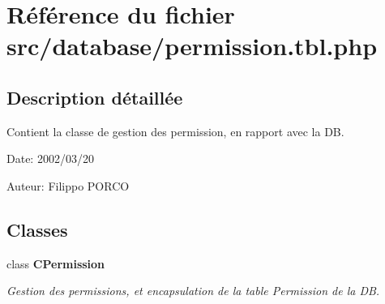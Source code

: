 \section{Référence du fichier src/database/permission.tbl.php}
\label{permission_8tbl_8php}


\subsection{Description détaillée}
Contient la classe de gestion des permission, en rapport avec la DB. 

\begin{Desc}
\item[Date:]2002/03/20\end{Desc}
\begin{Desc}
\item[Auteur:]Filippo PORCO \end{Desc}


\subsection*{Classes}
\begin{CompactItemize}
\item 
class {\bf CPermission}
\begin{CompactList}\small\item\em Gestion des permissions, et encapsulation de la table Permission de la DB. \item\end{CompactList}\end{CompactItemize}
